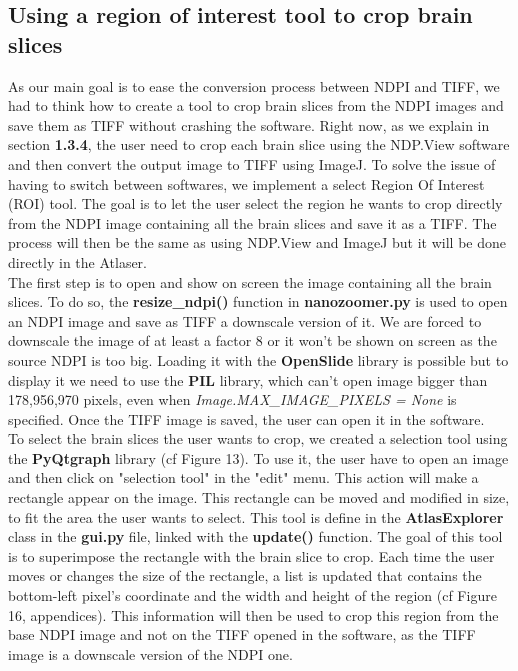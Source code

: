 \documentclass[a4paper,12pt]{report}
\begin{document}
\subsection{Using a region of interest tool to crop brain slices}
As our main goal is to ease the conversion process between NDPI and TIFF, we had to think how to create a tool to crop brain slices from the NDPI images and save them as TIFF without crashing the software. Right now, as we explain in section \textbf{1.3.4}, the user need to crop each brain slice using the NDP.View software and then convert the output image to TIFF using ImageJ. To solve the issue of having to switch between softwares, we implement a select Region Of Interest (ROI) tool. The goal is to let the user select the region he wants to crop directly from the NDPI image containing all the brain slices and save it as a TIFF. The process will then be the same as using NDP.View and ImageJ but it will be done directly in the Atlaser. \\
\indent The first step is to open and show on screen the image containing all the brain slices. To do so, the \textbf{resize\_ndpi()} function in \textbf{nanozoomer.py} is used to open an NDPI image and save as TIFF a downscale version of it. We are forced to downscale the image of at least a factor 8 or it won't be shown on screen as the source NDPI is too big. Loading it with the \textbf{OpenSlide} library is possible but to display it we need to use the \textbf{PIL} library, which can't open image bigger than 178,956,970 pixels, even when \textit{Image.MAX\_IMAGE\_PIXELS = None} is specified. Once the TIFF image is saved, the user can open it in the software. \\
\indent To select the brain slices the user wants to crop, we created a selection tool using the \textbf{PyQtgraph} library (cf Figure 13). To use it, the user have to open an image and then click on "selection tool" in the "edit" menu. This action will make a rectangle appear on the image. This rectangle can be moved and modified in size, to fit the area the user wants to select. This tool is define in the \textbf{AtlasExplorer} class in the \textbf{gui.py} file, linked with the \textbf{update()} function.
The goal of this tool is to superimpose the rectangle with the brain slice to crop. Each time the user moves or changes the size of the rectangle, a list is updated that contains the bottom-left pixel's coordinate and the width and height of the region (cf Figure 16, appendices). This information will then be used to crop this region from the base NDPI image and not on the TIFF opened in the software, as the TIFF image is a downscale version of the NDPI one. 
\end{document}
